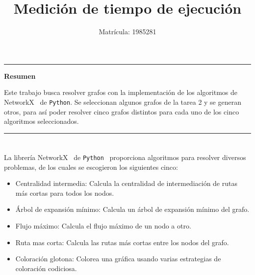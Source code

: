 \documentclass[a4paper, 11pt]{article}
\begin{document}
\title{Medición de tiempo de ejecución}
\author{Matr\'icula: 1985281}
\date{ }
\maketitle

\vspace{-1 cm}
\begin{center}\rule{\textwidth}{0.1mm} \end{center}
\vspace{-1.3 cm}
\begin {center}
\item \Large{\textbf{ Resumen}}
\end {center}

Este trabajo busca resolver grafos con la implementación de los algoritmos  de \color{blue}NetworkX\color{black}  \  de \color{blue} \texttt{Python}\color{black}. Se seleccionan algunos grafos de la tarea 2 y se generan otros, para así poder resolver cinco grafos distintos para cada uno de los cinco algoritmos seleccionados.
\vspace{-0.5cm}
\begin{center}\rule{\textwidth}{0.1mm} \end{center}




\section*{}
La librería \color{blue}NetworkX\color{black} \ de \color{blue}\texttt{Python} \color{black} \ proporciona algoritmos para resolver diversos problemas, de los cuales se escogieron los siguientes cinco:

\begin{itemize}
\item Centralidad intermedia: Calcula la centralidad de intermediación de rutas más cortas para todos los nodos.
\item Árbol de expansión mínimo: Calcula un árbol  de expansión mínimo del grafo.
\item Flujo máximo: Calcula el flujo máximo de un nodo a otro.
\item Ruta mas corta: Calcula las rutas más cortas entre los nodos del grafo.
\item Coloración glotona: Colorea una gráfica usando varias estrategias de coloración codiciosa.
\end{itemize}


\section*{}
\end{document}
